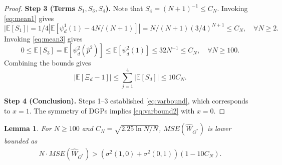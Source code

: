 \documentclass[12pt]{article}
\numberwithin{equation}{section}
\theoremstyle{plain}                         %
\newtheorem{lemma}{Lemma}
\theoremstyle{definition}                  %
\theoremstyle{remark}                      %
\newcommand{\E}{\mathbb{E}}
\begin{document}
\begin{proof}
\medskip  

\noindent \textbf{Step 3 (Terms $S_1, S_3, S_4$).} 
 Note that $S_4 =(N+1)^{-1} \leq C_N$.   Invoking \eqref{eq:mean1} gives
  $$
   |\E [S_1] | = 1/4 |\E [ \psi^1_{d} (1) - 4N/(N+1)] | =  N/(N+1) (3/4)^{N+1} \leq   C_N, \quad \forall N \geq 2.
   $$ 
Invoking \eqref{eq:mean3} gives
 $$
  0 \leq \E [S_3]  =\E [ \psi^2_{d} (\widehat{p}^2) ] \leq \E [ \psi^2_{d} (1) ]  \leq  32   N^{-1} \leq  C_N, \quad \forall N \geq 100.
  $$ 
Combining the bounds gives
$$
|\E [ \Xi_d -1] | \leq \sum_{j=1}^4 |\E [ S_d ]| \leq 10 C_N.
$$

\noindent \textbf{Step 4 (Conclusion).} Steps 1--3 established \eqref{eq:varbound}, which corresponds to $x=1$.  The symmetry of DGPs implies \eqref{eq:varbound2} with $x=0$. 
\end{proof}




  \begin{lemma}
  \label{lem:oracle}
 For $N \geq 100$ and $C_N = \sqrt{2.25 \ln N/N}$, $MSE (\widehat W_{G^{*}})$ is lower bounded as 
 \begin{align}
N \cdot MSE (\widehat W_{G^{*}}) > (\sigma^2(1,0) + \sigma^2(0,1)) (1- 10C_N). \label{eq:oraclemse}
 \end{align}
  \end{lemma}
\end{document}
